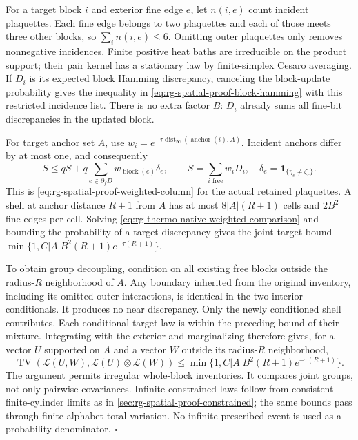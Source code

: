 For a target block \(i\) and exterior fine edge \(e\), let \(n(i,e)\)
count incident plaquettes. Each fine edge belongs to two plaquettes and
each of those meets three other blocks, so
\(\sum_i n(i,e)\le6\). Omitting outer plaquettes only removes
nonnegative incidences. Finite positive heat baths are irreducible on the
product support; their pair kernel has a stationary law by finite-simplex
Cesaro averaging. If \(D_i\) is its expected block Hamming discrepancy,
canceling the block-update probability gives the inequality in
\cref{eq:rg-spatial-proof-block-hamming} with this restricted incidence
list. There is no extra factor \(B\): \(D_i\) already sums all fine-bit
discrepancies in the updated block.

For target anchor set \(A\), use
\(w_i=e^{-\tau\operatorname{dist}_\infty(\operatorname{anchor}(i),A)}\).
Incident anchors differ by at most one, and consequently
\begin{equation}
 S\le qS+q\sum_{e\in\partial_f D}w_{\operatorname{block}(e)}\delta_e,
 \qquad S=\sum_{i\text{ free}}w_iD_i,
 \quad \delta_e=\mathbf1_{\{\eta_e\ne\zeta_e\}}.
 \label{eq:rg-thermo-native-weighted-comparison}
\end{equation}
This is \cref{eq:rg-spatial-proof-weighted-column} for the actual retained
plaquettes. A shell at anchor distance \(R+1\) from \(A\) has at most
\(8|A|(R+1)\) cells and \(2B^2\) fine edges per cell. Solving
\cref{eq:rg-thermo-native-weighted-comparison} and bounding the probability
of a target discrepancy gives the joint-target bound
\(\min\{1,C|A|B^2(R+1)e^{-\tau(R+1)}\}\).

To obtain group decoupling, condition on all existing free blocks outside
the radius-\(R\) neighborhood of \(A\). Any boundary inherited from the
original inventory, including its omitted outer interactions, is identical
in the two interior conditionals. It produces no near discrepancy. Only
the newly conditioned shell contributes. Each conditional target law is
within the preceding bound of their mixture. Integrating with the exterior
and marginalizing therefore gives, for a vector \(U\) supported on \(A\)
and a vector \(W\) outside its radius-\(R\) neighborhood,
\begin{equation}
 \operatorname{TV}(\mathcal L(U,W),\mathcal L(U)\otimes\mathcal L(W))
 \le\min\{1,C|A|B^2(R+1)e^{-\tau(R+1)}\}.
 \label{eq:rg-thermo-native-group-decoupling}
\end{equation}
The argument permits irregular whole-block inventories. It compares joint
groups, not only pairwise covariances. Infinite constrained laws follow
from consistent finite-cylinder limits as in
\cref{sec:rg-spatial-proof-constrained}; the same bounds pass through
finite-alphabet total variation. No infinite prescribed event is used as
a probability denominator. \hfill\(\square\)

